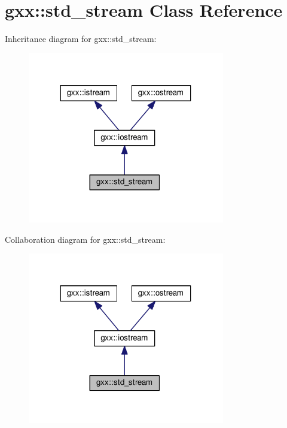 \hypertarget{classgxx_1_1std__stream}{}\section{gxx\+:\+:std\+\_\+stream Class Reference}
\label{classgxx_1_1std__stream}


Inheritance diagram for gxx\+:\+:std\+\_\+stream\+:
\nopagebreak
\begin{figure}[H]
\begin{center}
\leavevmode
\includegraphics[width=244pt]{classgxx_1_1std__stream__inherit__graph}
\end{center}
\end{figure}


Collaboration diagram for gxx\+:\+:std\+\_\+stream\+:
\nopagebreak
\begin{figure}[H]
\begin{center}
\leavevmode
\includegraphics[width=244pt]{classgxx_1_1std__stream__coll__graph}
\end{center}
\end{figure}
